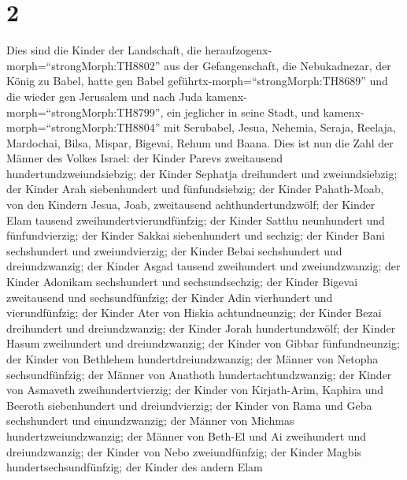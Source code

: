 \hypertarget{section-1}{%
\section{2}\label{section-1}}

 Dies sind die Kinder der Landschaft, die
heraufzogenx-morph=``strongMorph:TH8802'' aus der Gefangenschaft, die
Nebukadnezar, der König zu Babel, hatte gen Babel
geführtx-morph=``strongMorph:TH8689'' und die wieder gen Jerusalem und
nach Juda kamenx-morph=``strongMorph:TH8799'', ein jeglicher in seine
Stadt,  und kamenx-morph=``strongMorph:TH8804'' mit
Serubabel, Jesua, Nehemia, Seraja, Reelaja, Mardochai, Bilsa, Mispar,
Bigevai, Rehum und Baana. Dies ist nun die Zahl der Männer des Volkes
Israel:  der Kinder Parevs zweitausend
hundertundzweiundsiebzig;  der Kinder Sephatja dreihundert
und zweiundsiebzig;  der Kinder Arah siebenhundert und
fünfundsiebzig;  der Kinder Pahath-Moab, von den Kindern
Jesua, Joab, zweitausend achthundertundzwölf;  der Kinder
Elam tausend zweihundertvierundfünfzig;  der Kinder Satthu
neunhundert und fünfundvierzig;  der Kinder Sakkai
siebenhundert und sechzig;  der Kinder Bani sechshundert
und zweiundvierzig;  der Kinder Bebai sechshundert und
dreiundzwanzig;  der Kinder Asgad tausend zweihundert und
zweiundzwanzig;  der Kinder Adonikam sechshundert und
sechsundsechzig;  der Kinder Bigevai zweitausend und
sechsundfünfzig;  der Kinder Adin vierhundert und
vierundfünfzig;  der Kinder Ater von Hiskia achtundneunzig;
 der Kinder Bezai dreihundert und dreiundzwanzig;
 der Kinder Jorah hundertundzwölf;  der Kinder
Hasum zweihundert und dreiundzwanzig;  der Kinder von
Gibbar fünfundneunzig;  der Kinder von Bethlehem
hundertdreiundzwanzig;  der Männer von Netopha
sechsundfünfzig;  der Männer von Anathoth
hundertachtundzwanzig;  der Kinder von Asmaveth
zweihundertvierzig;  der Kinder von Kirjath-Arim, Kaphira
und Beeroth siebenhundert und dreiundvierzig;  der Kinder
von Rama und Geba sechshundert und einundzwanzig;  der
Männer von Michmas hundertzweiundzwanzig;  der Männer von
Beth-El und Ai zweihundert und dreiundzwanzig;  der Kinder
von Nebo zweiundfünfzig;  der Kinder Magbis
hundertsechsundfünfzig;  der Kinder des andern Elam
